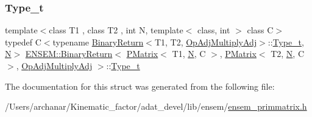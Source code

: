 \subsubsection{\texorpdfstring{Type\_t}{Type\_t}\hspace{0.1cm}{\footnotesize\ttfamily [2/2]}}
{\footnotesize\ttfamily template$<$class T1 , class T2 , int N, template$<$ class, int $>$ class C$>$ \\
typedef C$<$typename \mbox{\hyperlink{structENSEM_1_1BinaryReturn}{Binary\+Return}}$<$T1, T2, \mbox{\hyperlink{structENSEM_1_1OpAdjMultiplyAdj}{Op\+Adj\+Multiply\+Adj}}$>$\+::\mbox{\hyperlink{structENSEM_1_1BinaryReturn_3_01PMatrix_3_01T1_00_01N_00_01C_01_4_00_01PMatrix_3_01T2_00_01N_00_79410733ba13e6def1042c111bee3e0e_acfdb135f6900c8449768275be06883c7}{Type\+\_\+t}}, \mbox{\hyperlink{operator__name__util_8cc_a7722c8ecbb62d99aee7ce68b1752f337}{N}}$>$ \mbox{\hyperlink{structENSEM_1_1BinaryReturn}{E\+N\+S\+E\+M\+::\+Binary\+Return}}$<$ \mbox{\hyperlink{classENSEM_1_1PMatrix}{P\+Matrix}}$<$ T1, \mbox{\hyperlink{operator__name__util_8cc_a7722c8ecbb62d99aee7ce68b1752f337}{N}}, C $>$, \mbox{\hyperlink{classENSEM_1_1PMatrix}{P\+Matrix}}$<$ T2, \mbox{\hyperlink{operator__name__util_8cc_a7722c8ecbb62d99aee7ce68b1752f337}{N}}, C $>$, \mbox{\hyperlink{structENSEM_1_1OpAdjMultiplyAdj}{Op\+Adj\+Multiply\+Adj}} $>$\+::\mbox{\hyperlink{structENSEM_1_1BinaryReturn_3_01PMatrix_3_01T1_00_01N_00_01C_01_4_00_01PMatrix_3_01T2_00_01N_00_79410733ba13e6def1042c111bee3e0e_acfdb135f6900c8449768275be06883c7}{Type\+\_\+t}}}



The documentation for this struct was generated from the following file\+:\begin{DoxyCompactItemize}
\item 
/\+Users/archanar/\+Kinematic\+\_\+factor/adat\+\_\+devel/lib/ensem/\mbox{\hyperlink{lib_2ensem_2ensem__primmatrix_8h}{ensem\+\_\+primmatrix.\+h}}\end{DoxyCompactItemize}
